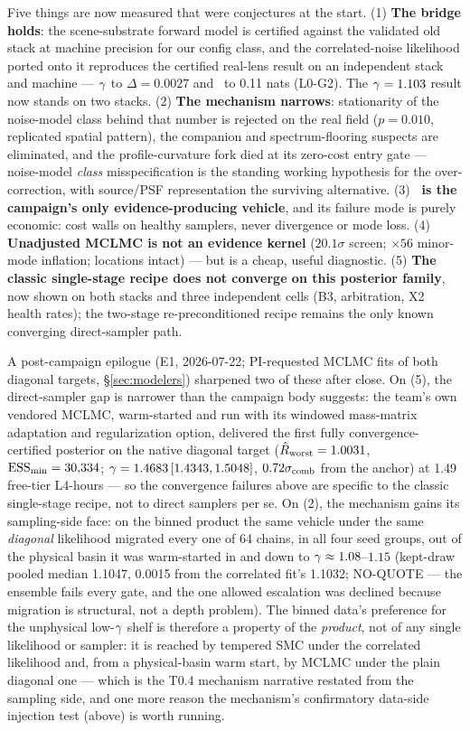 Five things are now measured that were conjectures at the start. (1) {\bf
The bridge holds}: the scene-substrate forward model is certified against
the validated old stack at machine precision for our config class, and the
correlated-noise likelihood ported onto it reproduces the certified
real-lens result on an independent stack and machine ---
$\gamma$ to $\Delta=0.0027$ and \logZ\ to 0.11 nats (L0-G2). The
$\gamma=1.103$ result now stands on two stacks. (2) {\bf The mechanism
narrows}: stationarity of the noise-model class behind that number is
rejected on the real field ($p=0.010$, replicated spatial pattern), the
companion and spectrum-flooring suspects are eliminated, and the
profile-curvature fork died at its zero-cost entry gate --- noise-model
{\it class} misspecification is the standing working hypothesis for the
over-correction, with source/PSF representation the surviving alternative.
(3) {\bf \mcsmc\ is the campaign's only evidence-producing vehicle}, and
its failure mode is purely economic: cost walls on healthy samplers, never
divergence or mode loss. (4) {\bf Unadjusted MCLMC is not an evidence
kernel} ($20.1\sigma$ screen; $\times56$ minor-mode inflation;
locations intact) --- but is a cheap, useful diagnostic. (5) {\bf The
classic single-stage recipe does not converge on this posterior family},
now shown on both stacks and three independent cells (B3, arbitration, X2
health rates); the two-stage re-preconditioned recipe remains the only
known converging direct-sampler path.

A post-campaign epilogue (E1, 2026-07-22; PI-requested MCLMC fits of both
diagonal targets, \S\ref{sec:modelers}) sharpened two of these after
close. On (5), the direct-sampler gap is narrower than the campaign body
suggests: the team's own vendored MCLMC, warm-started and run with its
windowed mass-matrix adaptation and regularization option, delivered the
first fully convergence-certified posterior on the  native
diagonal target ($\hat{R}_{\rm worst}=1.0031$, $\textrm{ESS}_{\min}=30{,}334$;
$\gamma=1.4683\,[1.4343,1.5048]$, $0.72\sigma_{\rm comb}$ from the
anchor) at 1.49 free-tier L4-hours --- so the convergence failures above
are specific to the classic single-stage recipe, not to direct samplers
per se. On (2), the mechanism gains its sampling-side face: on the binned
product the same vehicle under the same \emph{diagonal} likelihood
migrated every one of 64 chains, in all four seed groups, out of the
physical basin it was warm-started in and down to
$\gamma\approx1.08$--$1.15$ (kept-draw pooled median 1.1047, 0.0015
from the correlated fit's 1.1032; NO-QUOTE --- the ensemble fails every
gate, and the one allowed escalation was declined because migration is
structural, not a depth problem). The binned data's preference for the
unphysical low-$\gamma$ shelf is therefore a property of the
\emph{product}, not of any single likelihood or sampler: it is reached by
tempered SMC under the correlated likelihood and, from a physical-basin
warm start, by MCLMC under the plain diagonal one --- which is the T0.4 mechanism
narrative restated from the sampling side, and one more reason the
mechanism's confirmatory data-side injection test (above) is worth
running.

